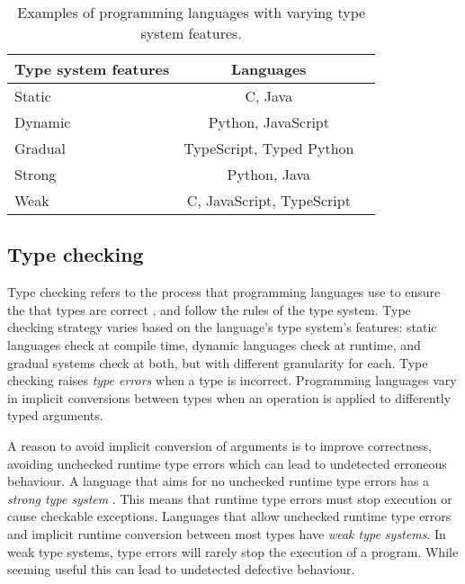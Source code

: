 \begin{table}[ht]
    \centering
    \begin{tabular}{@{}lcl@{}}
    \toprule
    Type system features       & Languages      \\ \midrule
    Static          & C,  Java           \\
    Dynamic         & Python, JavaScript \\ 
    Gradual         & TypeScript, Typed Python \\ \midrule
    Strong          & Python, Java \\
    Weak            & C, JavaScript, TypeScript  \\ \bottomrule
    \end{tabular}
    \caption{Examples of programming languages with varying type system features.}
    \label{table:1}
\end{table}

\subsection{Type checking}

Type checking refers to the process that programming languages use to ensure the that types are correct \cite{programming_langs}, and follow the rules of the type system. Type checking strategy varies based on the language's type system's features: static languages check at compile time, dynamic languages check at runtime, and gradual systems check at both, but with different granularity for each. Type checking raises \emph{type errors} when a type is incorrect. Programming languages vary in implicit conversions between types when an operation is applied to differently typed arguments. 

A reason to avoid implicit conversion of arguments is to improve correctness, avoiding unchecked runtime type errors which can lead to undetected erroneous behaviour. A language that aims for no unchecked runtime type errors has a \emph{strong type system} \cite{cardelli_typeful_1989}. This means that runtime type errors must stop execution or cause checkable exceptions. Languages that allow unchecked runtime type errors and implicit runtime conversion between most types have \emph{weak type systems}. In weak type systems, type errors will rarely stop the execution of a program. While seeming useful this can lead to undetected defective behaviour.

